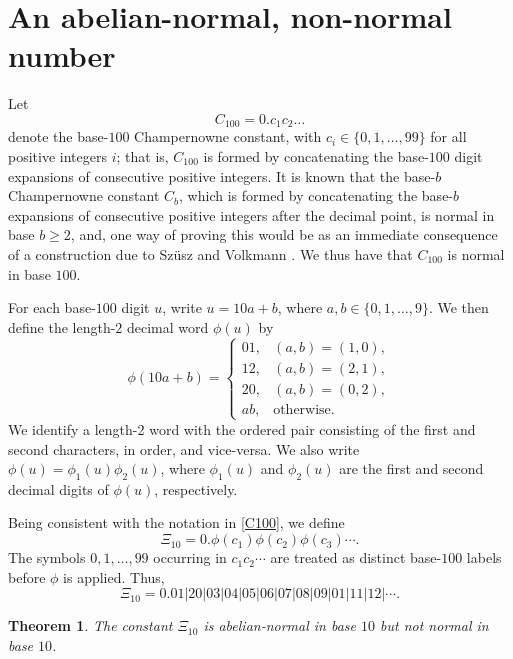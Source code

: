 \documentclass[12pt]{article}
\newtheorem{theorem}{Theorem}
\begin{document}
\section{An abelian-normal, non-normal number}\label{sectionabnormal}
 Let
\begin{equation}\label{C100}
 C_{100}=0.c_1c_2\ldots
\end{equation}
 denote the base-$100$ Champernowne constant, with
$c_i\in\{0,1,\ldots,99\}$ for all positive integers $i$; that is,
$C_{100}$ is formed by concatenating the base-$100$ digit expansions of
consecutive positive integers. 
 It is known that the base-$b$ Champernowne constant $C_b$, which is 
 formed by concatenating the base-$b$ expansions of consecutive positive integers after the decimal point, 
 is normal in base $b \geq 2$, 
 and, one way of proving this would be
 as an immediate consequence of a construction due to 
 Sz\"usz and Volkmann \cite{SzuszVolkmann1994}. 
 We thus have that $C_{100}$ is normal in base $100$. 
 
For each base-$100$ digit $u$, write $u=10a+b$, where    $a,b\in\{0,1,\ldots,9\}$. We then define the length-$2$ decimal   word  
 $\phi(u)$     by
\begin{equation}\label{definephi}
 \phi(10a+b)=
 \begin{cases}
 01, & (a,b)=(1,0),\\
 12, & (a,b)=(2,1),\\
 20, & (a,b)=(0,2),\\
 ab, & \text{otherwise.}
 \end{cases}
\end{equation}
 We identify a length-2 word with the ordered pair consisting of
 the first and second characters, in order, and vice-versa. 
 We also write
$\phi(u)=\phi_1(u)\phi_2(u)$, where $\phi_1(u)$ and $\phi_2(u)$ are the
first and second decimal digits of $\phi(u)$, respectively.

Being consistent with the notation in \eqref{C100}, we define
\begin{equation}\label{defineXi10}
 \Xi_{10}=0.\phi(c_1)\phi(c_2)\phi(c_3)\cdots.
\end{equation}
The symbols $0,1,\ldots,99$ occurring in $c_1c_2\cdots$ are treated as
distinct base-$100$ labels before $\phi$ is applied. Thus,
$$
 \Xi_{10}
 =0.01{\big|}20{\big|}03{\big|}04{\big|}05{\big|}06{\big|}
 07{\big|}08{\big|}09{\big|}01{\big|}11{\big|}12{\big|}\cdots.
$$

\begin{theorem}\label{theoremXi10}
 The constant $\Xi_{10}$ is abelian-normal in base $10$ but not normal
 in base $10$.
\end{theorem}
\end{document}
